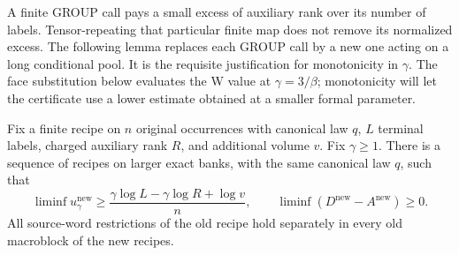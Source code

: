 A finite GROUP call pays a small excess of auxiliary rank over its number of
labels.  Tensor-repeating that particular finite map does not remove its
normalized excess.  The following lemma replaces each GROUP call by a new
one acting on a long conditional pool.  It is the requisite justification for
monotonicity in $\gamma$.  The face substitution below evaluates the W value
at $\gamma=3/\beta$; monotonicity will let the certificate use a lower
estimate obtained at a smaller formal parameter.

\begin{lemma}
\label{val:recompile}
Fix a finite recipe on $n$ original occurrences with canonical law $q$, $L$
terminal labels, charged auxiliary rank $R$, and additional volume $v$.
Fix $\gamma\ge1$.  There is a sequence of recipes on larger exact banks,
with the same canonical law $q$, such that
\begin{equation}
 \liminf u_\gamma^{\mathrm{new}}
 \ge \frac{\gamma\log L-\gamma\log R+\log v}{n},
 \qquad
 \liminf(D^{\mathrm{new}}-A^{\mathrm{new}})\ge0.
\label{val:recompile-goal}
\end{equation}
All source-word restrictions of the old recipe hold separately in every old
macroblock of the new recipes.
\end{lemma}

